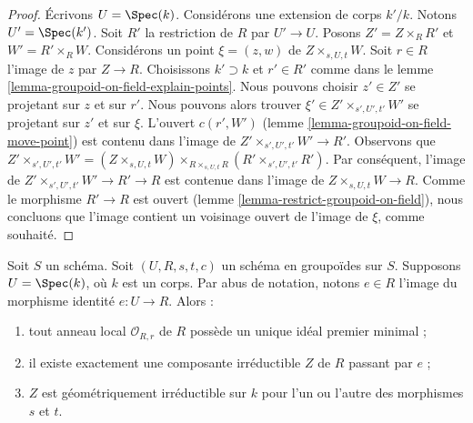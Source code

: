 \begin{proof}
Écrivons $U = \Spec(k)$. Considérons une extension de corps $k'/k$. Notons
$U' = \Spec(k')$. Soit $R'$ la restriction de $R$ par $U' \to U$.
Posons $Z' = Z \times_R R'$ et $W' = R' \times_R W$.
Considérons un point $\xi = (z, w)$ de $Z \times_{s, U, t} W$.
Soit $r \in R$ l'image de $z$ par $Z \to R$.
Choisissons $k' \supset k$ et $r' \in R'$ comme dans le
lemme \ref{lemma-groupoid-on-field-explain-points}.
Nous pouvons choisir $z' \in Z'$ se projetant sur $z$ et sur $r'$.
Nous pouvons alors trouver $\xi' \in Z' \times_{s', U', t'} W'$
se projetant sur $z'$ et sur $\xi$. L'ouvert $c(r', W')$
(lemme \ref{lemma-groupoid-on-field-move-point}) est
contenu dans l'image de $Z' \times_{s', U', t'} W' \to R'$.
Observons que $Z' \times_{s', U', t'} W' = (Z \times_{s, U, t} W)
\times_{R \times_{s, U, t} R} (R' \times_{s', U', t'} R')$.
Par conséquent, l'image de $Z' \times_{s', U', t'} W' \to R' \to R$
est contenue dans l'image de $Z \times_{s, U, t} W \to R$.
Comme le morphisme $R' \to R$ est ouvert (lemme \ref{lemma-restrict-groupoid-on-field}),
nous concluons que l'image contient un voisinage ouvert de
l'image de $\xi$, comme souhaité.
\end{proof}

\begin{lemma}
\label{lemma-groupoid-on-field-geometrically-irreducible}
Soit $S$ un schéma. Soit $(U, R, s, t, c)$ un schéma en groupoïdes
sur $S$. Supposons $U = \Spec(k)$, où $k$ est un corps.
Par abus de notation, notons $e \in R$ l'image du morphisme identité
$e : U \to R$. Alors :
\begin{enumerate}
\item tout anneau local $\mathcal{O}_{R, r}$ de $R$ possède un unique
idéal premier minimal ;
\item il existe exactement une composante irréductible $Z$ de $R$
passant par $e$ ;
\item $Z$ est géométriquement irréductible sur $k$ pour l'un ou l'autre
des morphismes $s$ et $t$.
\end{enumerate}
\end{lemma}

